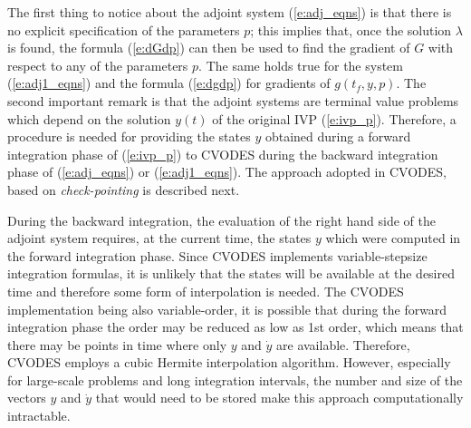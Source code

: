 The first thing to notice about the adjoint system (\ref{e:adj_eqns}) is that there is 
no explicit specification of the parameters $p$; this implies that, once the solution
$\lambda$ is found, the formula (\ref{e:dGdp}) can then be used to find the gradient
of $G$ with respect to any of the parameters $p$. The same holds true for the system
(\ref{e:adj1_eqns}) and the formula (\ref{e:dgdp}) for gradients of $g(t_f,y,p)$. 
The second important remark is that the adjoint systems are terminal value problems 
which depend on the solution $y(t)$ of the original IVP (\ref{e:ivp_p}). 
Therefore, a procedure is needed for providing the states $y$ obtained during a forward 
integration phase of (\ref{e:ivp_p}) to CVODES during the backward integration phase 
of (\ref{e:adj_eqns}) or (\ref{e:adj1_eqns}). 
The approach adopted in CVODES, based on {\em check-pointing} is described next.

During the backward integration, the evaluation of the right hand side 
of the adjoint system requires, at the current time, the states $y$ which
were computed in the forward integration phase.
Since CVODES implements variable-stepsize integration formulas,
it is unlikely that the states will be available at the desired time and
therefore some form of interpolation is needed. The CVODES implementation
being also variable-order, it is possible that during the forward
integration phase the order may be reduced as low as 1st order,
which means that there may be points in time where only $y$ and ${\dot y}$
are available. Therefore, CVODES employs a cubic Hermite interpolation
algorithm. However, especially for large-scale problems and long integration
intervals, the number and size of the vectors $y$ and ${\dot y}$ that would 
need to be stored make this approach computationally intractable. 

